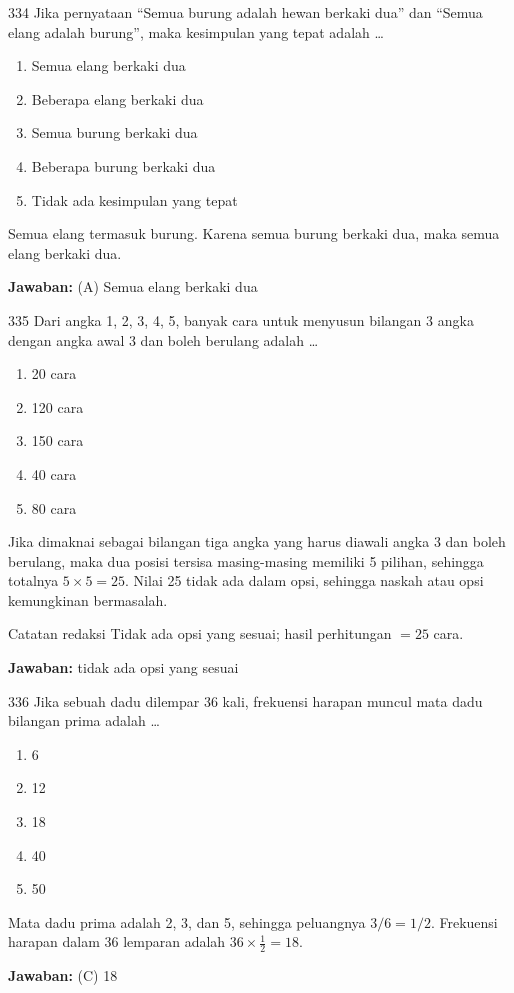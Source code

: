 \documentclass[11pt]{article}
\newenvironment{pil}{\begin{enumerate}[label=(\Alph*),leftmargin=*,itemsep=1pt,topsep=3pt]}{\end{enumerate}}
\newcommand{\jw}[1]{\par\smallskip\begin{jawbox}\textbf{Jawaban:} #1\end{jawbox}}
\begin{document}
\begin{soalbox}{3}{34}
Jika pernyataan ``Semua burung adalah hewan berkaki dua'' dan ``Semua elang adalah burung'', maka kesimpulan yang tepat adalah \ldots
\begin{pil}\item Semua elang berkaki dua \item Beberapa elang berkaki dua \item Semua burung berkaki dua \item Beberapa burung berkaki dua \item Tidak ada kesimpulan yang tepat\end{pil}
\end{soalbox}
\begin{pembox}
Semua elang termasuk burung. Karena semua burung berkaki dua, maka semua elang berkaki dua.
\jw{(A) Semua elang berkaki dua}
\end{pembox}

\begin{soalbox}{3}{35}
Dari angka 1, 2, 3, 4, 5, banyak cara untuk menyusun bilangan 3 angka dengan angka awal 3 dan boleh berulang adalah \ldots
\begin{pil}\item 20 cara \item 120 cara \item 150 cara \item 40 cara \item 80 cara\end{pil}
\end{soalbox}
\begin{pembox}
Jika dimaknai sebagai bilangan tiga angka yang harus diawali angka 3 dan boleh berulang, maka dua posisi tersisa masing-masing memiliki 5 pilihan, sehingga totalnya $5\times5=25$. Nilai 25 tidak ada dalam opsi, sehingga naskah atau opsi kemungkinan bermasalah.
\begin{infobox}{Catatan redaksi}
Tidak ada opsi yang sesuai; hasil perhitungan $=25$ cara.
\end{infobox}
\jw{tidak ada opsi yang sesuai}
\end{pembox}

\begin{soalbox}{3}{36}
Jika sebuah dadu dilempar 36 kali, frekuensi harapan muncul mata dadu bilangan prima adalah \ldots
\begin{pil}\item 6 \item 12 \item 18 \item 40 \item 50\end{pil}
\end{soalbox}
\begin{pembox}
Mata dadu prima adalah 2, 3, dan 5, sehingga peluangnya $3/6=1/2$. Frekuensi harapan dalam 36 lemparan adalah $36\times\frac{1}{2}=18$.
\jw{(C) 18}
\end{pembox}
\end{document}
